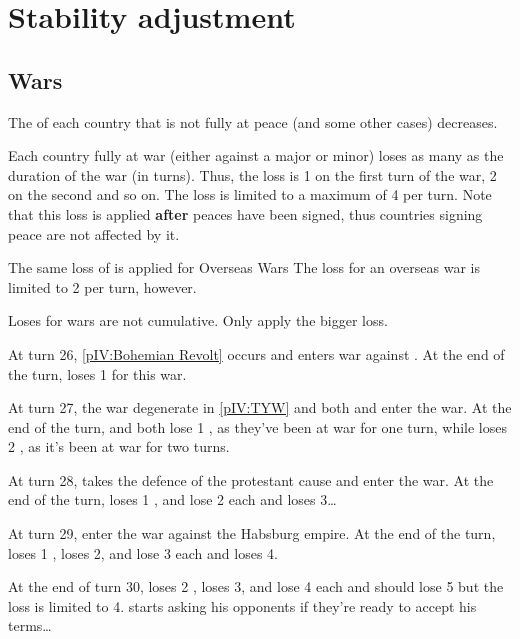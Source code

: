 \section{Stability adjustment}\label{chPeace:Stability}
\subsection{Wars}
\aparag The \STAB of each country that is not fully at peace (and some other
cases) decreases.

\bparag Each country fully at war (either against a major or minor) loses as
many \STAB as the duration of the war (in turns).
\bparag Thus, the loss is 1 \STAB on the first turn of the war, 2 on the
second and so on.
\bparag The loss is limited to a maximum of 4 \STAB per turn.
\bparag Note that this loss is applied \textbf{after} peaces have been signed,
thus countries signing peace are not affected by it.

\bparag The same loss of \STAB is applied for Overseas Wars
\bparag The loss for an overseas war is limited to 2 \STAB per turn, however.

 Loses for wars are not cumulative. Only apply the
bigger loss.

\begin{exemple}
  At turn 26, \ref{pIV:Bohemian Revolt} occurs and \AUS enters war against
  \paysBoheme. At the end of the turn, \AUS loses 1 \STAB for this war.

  At turn 27, the war degenerate in \ref{pIV:TYW} and both \HIS and \HOL enter
  the war. At the end of the turn, \HIS and \HOL both lose 1 \STAB, as they've
  been at war for one turn, while \AUS loses 2 \STAB, as it's been at war for
  two turns.

  At turn 28, \SUE takes the defence of the protestant cause and enter the
  war. At the end of the turn, \SUE loses 1 \STAB, \HIS and \HOL lose 2 each
  and \AUS loses 3\ldots

  At turn 29, \FRA enter the war against the Habsburg empire. At the end of
  the turn, \FRA loses 1 \STAB, \SUE loses 2, \HIS and \HOL lose 3 each and
  \AUS loses 4.

  At the end of turn 30, \FRA loses 2 \STAB, \SUE loses 3, \HOL and \HIS lose
  4 each and \AUS should lose 5 but the loss is limited to
  4. \ministreRichelieu starts asking his opponents if they're ready to accept
  his terms\ldots
\end{exemple}

